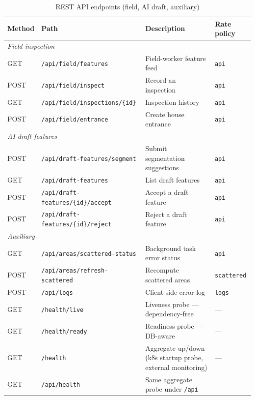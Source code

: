 \documentclass[12pt,a4paper]{article}
\theoremstyle{definition}
\theoremstyle{plain}
\theoremstyle{remark}
\begin{document}
\begin{table}[H]
\centering
\caption{REST API endpoints (field, AI draft, auxiliary)}
\begin{tabularx}{\textwidth}{ll>{\raggedright\arraybackslash}Xl}
\toprule
\textbf{Method} & \textbf{Path} & \textbf{Description} & \textbf{Rate policy} \\
\midrule
\multicolumn{4}{l}{\textit{Field inspection}} \\
GET  & \texttt{/api/field/features}           & Field-worker feature feed       & \texttt{api} \\
POST & \texttt{/api/field/inspect}            & Record an inspection            & \texttt{api} \\
GET  & \texttt{/api/field/inspections/\{id\}} & Inspection history              & \texttt{api} \\
POST & \texttt{/api/field/entrance}           & Create house entrance           & \texttt{api} \\
\midrule
\multicolumn{4}{l}{\textit{AI draft features}} \\
POST & \texttt{/api/draft-features/segment}       & Submit segmentation suggestions & \texttt{api} \\
GET  & \texttt{/api/draft-features}               & List draft features             & \texttt{api} \\
POST & \texttt{/api/draft-features/\{id\}/accept} & Accept a draft feature          & \texttt{api} \\
POST & \texttt{/api/draft-features/\{id\}/reject} & Reject a draft feature          & \texttt{api} \\
\midrule
\multicolumn{4}{l}{\textit{Auxiliary}} \\
GET  & \texttt{/api/areas/scattered-status}    & Background task error status   & \texttt{api} \\
POST & \texttt{/api/areas/refresh-scattered}   & Recompute scattered areas      & \texttt{scattered} \\
POST & \texttt{/api/logs}                      & Client-side error log          & \texttt{logs} \\
GET  & \texttt{/health/live}                   & Liveness probe — dependency-free & --- \\
GET  & \texttt{/health/ready}                  & Readiness probe — DB-aware     & --- \\
GET  & \texttt{/health}                        & Aggregate up/down (k8s startup probe, external monitoring)  & --- \\
GET  & \texttt{/api/health}                    & Same aggregate probe under \texttt{/api} & --- \\
\bottomrule
\end{tabularx}
\end{table}
\end{document}
